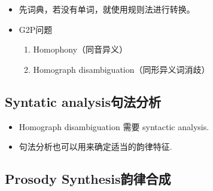 \documentclass[UTF8]{ctexart}
\begin{document}
\begin{itemize}
    \item 先词典，若没有单词，就使用规则法进行转换。

    \item G2P问题
    \begin{enumerate}
        \item Homophony（同音异义）
        \item Homograph disambiguation（同形异义词消歧）
    \end{enumerate}
\end{itemize}

\subsection{Syntatic analysis句法分析}
\begin{itemize}
    \item Homograph disambiguation 需要 syntactic analysis.
    \item 句法分析也可以用来确定适当的韵律特征.
\end{itemize}

\subsection{Prosody Synthesis韵律合成}
\end{document}
